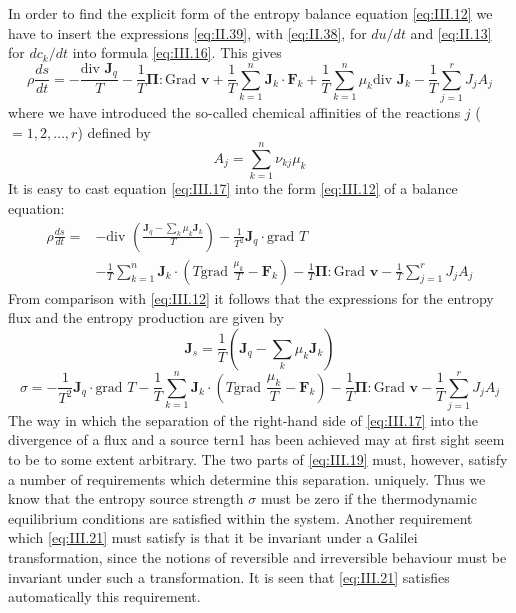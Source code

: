 In order to find the explicit form of the entropy balance equation
\eqref{eq:III.12} we have to insert the expressions \eqref{eq:II.39}, with \eqref{eq:II.38}, for $d u / d t$ and \eqref{eq:II.13} for $d c_k / d t$ into formula \eqref{eq:III.16}. This gives
\begin{equation}
\rho \frac{ds}{dt} = - \frac{\textrm{div } \bm{J}_q}{T} - \frac{1}{T} \bm{\Pi} : \textrm{Grad } \bm{v} + \frac{1}{T} \sum_{k=1}^{n} \bm{J}_k \cdot \bm{F}_k + \frac{1}{T} \sum_{k=1}^{n} \mu_k \textrm{div } \bm{J}_k - \frac{1}{T} \sum_{j=1}^r J_j A_j
    \label{eq:III.17}
\end{equation}
where we have introduced the so-called chemical affinities of the
reactions $j$ ( $= 1, 2, \ldots , r$) defined by
\begin{equation}
A_j = \sum_{k=1}^n \nu_{kj} \mu_k
    \label{eq:III.18}
\end{equation}
It is easy to cast equation \eqref{eq:III.17} into the form \eqref{eq:III.12} of a balance equation:
\begin{equation}
\begin{split}
    \rho \frac{ds}{dt} = &- \textrm{div } \left( \frac{\bm{J}_q - \sum_{k} \mu_k \bm{J}_k}{T} \right) 
- 
\frac{1}{T^2} \bm{J}_q \cdot \textrm{grad } T \\
&- 
\frac{1}{T} \sum_{k=1}^{n} \bm{J}_k \cdot \left( T \textrm{grad } \frac{\mu_k}{T} - \bm{F}_k \right)
- 
\frac{1}{T} \bm{\Pi} : \textrm{Grad } \bm{v} - \frac{1}{T} \sum_{j=1}^r J_j A_j
\end{split}
    \label{eq:III.19}
\end{equation}
From comparison with \eqref{eq:III.12} it follows that the expressions for the entropy flux and the entropy production are given by
\begin{equation}
\bm{J}_s = \frac{1}{T} \left( \bm{J}_q - \sum_k \mu_k \bm{J}_k \right)
    \label{eq:III.20}
\end{equation}
\begin{equation}
\sigma = - \frac{1}{T^2} \bm{J}_q \cdot \textrm{grad } T
- 
\frac{1}{T} \sum_{k=1}^{n} \bm{J}_k \cdot \left( T \textrm{grad } \frac{\mu_k}{T} - \bm{F}_k \right)
- 
\frac{1}{T} \bm{\Pi} : \textrm{Grad } \bm{v} - \frac{1}{T} \sum_{j=1}^r J_j A_j
    \label{eq:III.21}
\end{equation}
The way in which the separation of the right-hand side of \eqref{eq:III.17} into the divergence of a flux and a source tern1 has been achieved may at first sight seem to be to some extent arbitrary. The two parts of \eqref{eq:III.19} must, however, satisfy a number of requirements which determine this separation. uniquely. Thus we know that the entropy source strength $\sigma$ must be zero if the thermodynamic equilibrium conditions are satisfied within the system. Another requirement which \eqref{eq:III.21} must satisfy is that it be invariant under a Galilei transformation, since the notions of reversible and irreversible behaviour must be invariant under such a
transformation. It is seen that \eqref{eq:III.21} satisfies automatically this requirement.

